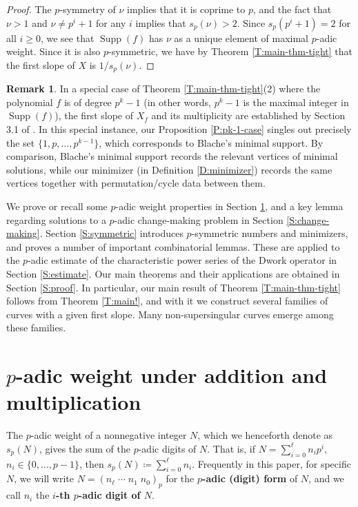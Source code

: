 \documentclass{amsart}
\numberwithin{equation}{section}
\DeclareMathOperator{\Supp}{Supp}
\theoremstyle{plain}
\theoremstyle{definition}
\newtheorem*{remark*}{Remark}
\begin{document}
\begin{proof}
    The $p$-symmetry of $\nu$ implies that it is coprime to $p$,
    and the fact that $\nu > 1$ and $\nu \ne p^i + 1$ for any $i$
    implies that $s_p(\nu) > 2$.
    Since $s_p(p^i + 1) = 2$ for all $i \ge 0$,
    we see that $\Supp(f)$ has $\nu$ as a unique element of maximal $p$-adic weight.
    Since it is also $p$-symmetric, 
    we have by Theorem \ref{T:main-thm-tight}
    that the first slope of $X$ is $1/s_p(\nu)$.
\end{proof}

\begin{remark*} 
In a special case of Theorem \ref{T:main-thm-tight}(2) 
where the polynomial $f$ is of degree $p^k-1$ (in other words, 
$p^k-1$ is the maximal integer in $\Supp(f)$), 
the first slope of $X_f$ and its multiplicity are established by Section 3.1 of \cite{Bl21}.
In this special instance, our Proposition \ref{P:pk-1-case} singles out precisely the set $\{1,p,\ldots,p^{k-1}\}$, which corresponds to Blache's minimal support. 
By comparison, Blache's minimal support records the relevant vertices of minimal solutions, while our minimizer (in Definition \ref{D:minimizer}) records the same vertices together with permutation/cycle data between them. 
\end{remark*}

\vspace{5mm}

We prove or recall some $p$-adic weight properties in Section \ref{S:p-weight}, 
and a key lemma regarding solutions to a $p$-adic change-making 
problem in Section \ref{S:change-making}.
Section \ref{S:symmetric} introduces $p$-symmetric numbers 
and minimizers, and proves a number of important combinatorial lemmas. 
These are applied to the
$p$-adic estimate of the characteristic power series 
of the Dwork operator in Section \ref{S:estimate}.
Our main theorems
and their applications are obtained in Section \ref{S:proof}.
In particular, our main result of
Theorem \ref{T:main-thm-tight}
follows from Theorem \ref{T:main!},
and with it we construct several families of curves
with a given first slope.
Many non-supersingular curves emerge among these families.

\section{\texorpdfstring{$p$}{p}-adic weight under addition and multiplication}
\label{S:p-weight}
The $p$-adic weight of a nonnegative integer $N$,
which we henceforth denote as $s_p(N)$,
gives the sum of the $p$-adic digits of $N$.
That is, if $N = \sum_{i=0}^\ell n_i p^i$, $n_i \in \{0,\dots,p-1\}$,
then
$s_p(N)\coloneqq \sum_{i=0}^\ell n_i$.
Frequently in this paper, for specific $N$, we will write
$N=(n_\ell\; \cdots\; n_1 \; n_0)_p$
for the {\bf $p$-adic (digit) form} of $N$,
and we call $n_i$ the {\bf $i$-th $p$-adic digit of $N$}.
\end{document}
